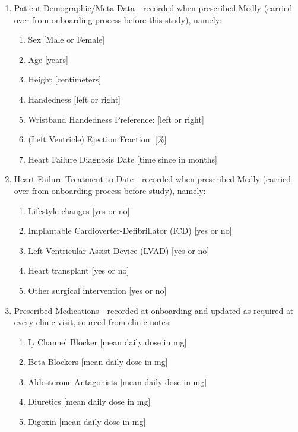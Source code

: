 \documentclass[]{article}
\begin{document}
\begin{enumerate}
\begin{enumerate}
		\end{enumerate}
	\item Patient Demographic/Meta Data - recorded when prescribed Medly (carried over from onboarding process before this study), namely:
		\begin{enumerate}
			\item Sex [Male or Female]
			\item Age [years]
			\item Height [centimeters]
			\item Handedness [left or right]
			\item Wristband Handedness Preference: [left or right]
			\item (Left Ventricle) Ejection Fraction: [\%]
			\item Heart Failure Diagnosis Date [time since in months]
		\end{enumerate}
	\item Heart Failure Treatment to Date - recorded when prescribed Medly (carried over from onboarding process before study), namely:
		\begin{enumerate}
			\item Lifestyle changes [yes or no]
			\item Implantable Cardioverter-Defibrillator (ICD) [yes or no]
			\item Left Ventricular Assist Device (LVAD) [yes or no]
			\item Heart transplant [yes or no]
			\item Other surgical intervention [yes or no]
		\end{enumerate}
	\item Prescribed Medications - recorded at onboarding and updated as required at every clinic visit, sourced from clinic notes:
	\begin{enumerate}
		\item I$_f$ Channel Blocker [mean daily dose in mg]  %
		\item Beta Blockers [mean daily dose in mg]  %
		\item Aldosterone Antagonists [mean daily dose in mg]  %
		\item Diuretics [mean daily dose in mg]  %
		\item Digoxin [mean daily dose in mg]  %
	\end{enumerate} 
\end{enumerate}
\end{document}
